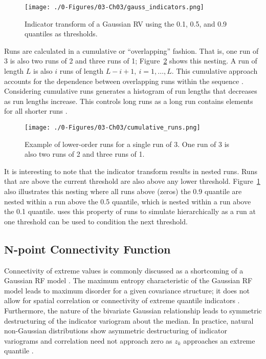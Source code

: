 \begin{figure}[htb!]
    \centering
    \texttt{[image: ./0-Figures/03-Ch03/gauss\_indicators.png]}
    \caption{Indicator transform of a Gaussian \gls{RV} using the 0.1, 0.5, and 0.9 quantiles as thresholds. }
    \label{fig:gauss_indicators}
\end{figure}

Runs are calculated in a cumulative or ``overlapping'' fashion. That is, one run of 3 is also two runs of 2 and three runs of 1; Figure~\ref{fig:cumulative_runs} shows this nesting. A run of length $L$ is also $i$ runs of length $L-i+1, \ i=1,\dots,L$. This cumulative approach accounts for the dependence between overlapping runs within the sequence \citep{mood1940distribution}. Considering cumulative runs generates a histogram of run lengths that decreases as run lengths increase. This controls long runs as a long run contains elements for all shorter runs \citep{ortiz2003characterization}.

\begin{figure}[htb!]
    \centering
    \texttt{[image: ./0-Figures/03-Ch03/cumulative\_runs.png]}
    \caption{Example of lower-order runs for a single run of 3. One run of 3 is also two runs of 2 and three runs of 1.}
    \label{fig:cumulative_runs}
\end{figure}

It is interesting to note that the indicator transform results in nested runs. Runs that are above the current threshold are also above any lower threshold. Figure~\ref{fig:gauss_indicators} also illustrates this nesting where all runs above (zeros) the 0.9 quantile are nested within a run above the 0.5 quantile, which is nested within a run above the 0.1 quantile. \cite{ortiz2003characterization} uses this property of runs to simulate hierarchically as a run at one threshold can be used to condition the next threshold.

\FloatBarrier
\subsection{$\mathbf{N}$-point Connectivity Function}
\label{subsec:03npoint}

Connectivity of extreme values is commonly discussed as a shortcoming of a Gaussian \gls{RF} model \citep{journel1993entropy,journel1989nongaussian}. The maximum entropy characteristic of the Gaussian \gls{RF} model leads to maximum disorder for a given covariance structure; it does not allow for spatial correlation or connectivity of extreme quantile indicators \citep{journel1989nongaussian}. Furthermore, the nature of the bivariate Gaussian relationship leads to symmetric destructuring of the indicator variogram about the median. In practice, natural non-Gaussian distributions show asymmetric destructuring of indicator variograms \citep{vincent2021multipleindicator} and correlation need not approach zero as $z_{k}$ approaches an extreme quantile \citep{journel1989nongaussian}.

